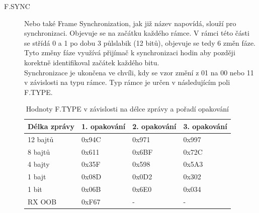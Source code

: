 \documentclass{ctuthesis}
\begin{document}
\begin{description}
\item[F.SYNC]
Nebo také Frame Synchronization, jak již název napovídá, slouží pro synchronizaci. Objevuje se na začátku každého rámce. V rámci této části se střídá 0 a 1 po dobu 3 půlslabik (12 bitů), objevuje se tedy 6 změn fáze. Tyto změny fáze využívá přijímač k synchronizaci hodin aby později korektně identifikoval začátek každého bitu.\\
Synchronizace je ukončena ve chvíli, kdy se vzor změní z 01 na 00 nebo 11 v závislosti na typu rámce. Typ rámce je určen v následujícím poli F.TYPE.

\begin{table}[]
\begin{tabular}{@{}llll@{}}
\toprule
Délka zprávy & 1. opakování & 2. opakování & 3. opakování \\ \midrule
12 bajtů     & 0x94C        & 0x971        & 0x997        \\
8 bajtů      & 0x611        & 0x6BF        & 0x72C        \\
4 bajty      & 0x35F        & 0x598        & 0x5A3        \\
1 bajt       & 0x08D        & 0x0D2        & 0x302        \\
1 bit        & 0x06B        & 0x6E0        & 0x034        \\
RX OOB       & 0xF67        & -            & -            \\ \bottomrule
\end{tabular}
\caption{Hodnoty F.TYPE v závislosti na délce zprávy a pořadí opakování \cite{sigfoxprotocol}}
\label{tab:ftype}
\end{table}


\end{description}
\end{document}
